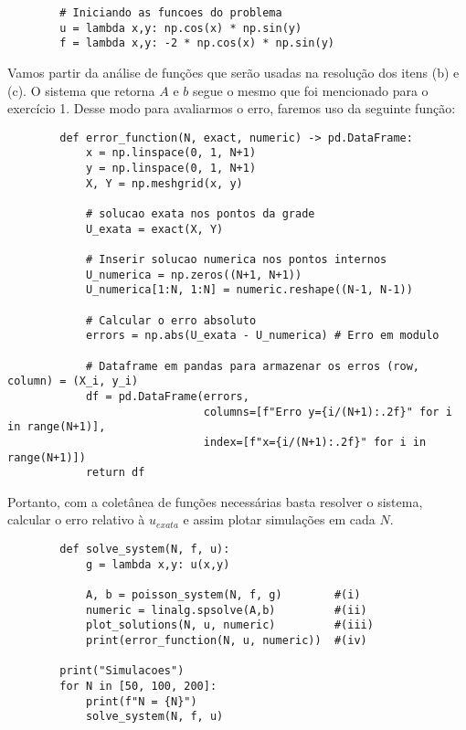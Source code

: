 \documentclass[column,amsmath,amssymb,floatfix]{revtex4}
\begin{document}
        \begin{lstlisting}
        # Iniciando as funcoes do problema
        u = lambda x,y: np.cos(x) * np.sin(y)
        f = lambda x,y: -2 * np.cos(x) * np.sin(y)
        \end{lstlisting}

        Vamos partir da análise de funções que serão usadas na resolução dos itens (b) e (c). O sistema que retorna $A$ e $b$ segue o mesmo que foi mencionado para o exercício 1. Desse modo para avaliarmos o erro, faremos uso da seguinte função:
        
        \begin{lstlisting}
        def error_function(N, exact, numeric) -> pd.DataFrame:
            x = np.linspace(0, 1, N+1)
            y = np.linspace(0, 1, N+1)
            X, Y = np.meshgrid(x, y)
        
            # solucao exata nos pontos da grade
            U_exata = exact(X, Y)
        
            # Inserir solucao numerica nos pontos internos
            U_numerica = np.zeros((N+1, N+1))
            U_numerica[1:N, 1:N] = numeric.reshape((N-1, N-1))
        
            # Calcular o erro absoluto
            errors = np.abs(U_exata - U_numerica) # Erro em modulo
        
            # Dataframe em pandas para armazenar os erros (row, column) = (X_i, y_i)
            df = pd.DataFrame(errors, 
                              columns=[f"Erro y={i/(N+1):.2f}" for i in range(N+1)],
                              index=[f"x={i/(N+1):.2f}" for i in range(N+1)])
            return df   
        \end{lstlisting}
        
        Portanto, com a coletânea de funções necessárias basta resolver o sistema, calcular o erro relativo à $u_{exata}$ e assim plotar simulações em cada $N$.
        
        \begin{lstlisting}
        def solve_system(N, f, u):
            g = lambda x,y: u(x,y)
        
            A, b = poisson_system(N, f, g)        #(i)
            numeric = linalg.spsolve(A,b)         #(ii)
            plot_solutions(N, u, numeric)         #(iii)
            print(error_function(N, u, numeric))  #(iv)
        
        print("Simulacoes")
        for N in [50, 100, 200]:
            print(f"N = {N}")
            solve_system(N, f, u)
        \end{lstlisting}
        
\end{document}
